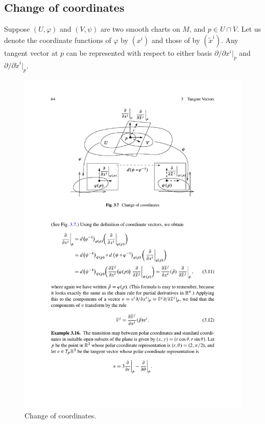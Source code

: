 \subsection{Change of coordinates}
Suppose $(U,\varphi)$ and $(V,\psi)$ are two smooth charts on $M$, and $p\in U\cap V$. Let us denote the coordinate functions of $\varphi$ by $(x^i)$ and those of by $(\widetilde{x}^i)$. Any tangent vector at $p$ can be represented with respect to either basis $\partial/\partial x^i|_p$ and $\partial/\partial\widetilde{x}^i|_p$.\par
\begin{figure}[htbp]
    \centering
    \includegraphics{pictures/coordinate-change}
    \caption{Change of coordinates.}
\end{figure}

